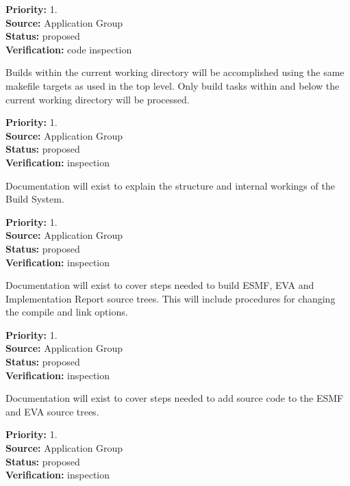 \begin{reqlist}
{\bf Priority:} 1. \\
{\bf Source:} Application Group \\
{\bf Status:} proposed \\
{\bf Verification:} code inspection
\end{reqlist}

Builds within the current working directory will be
accomplished using the same makefile targets as
used in the top level.
Only build tasks within and below the current working directory
will be processed.  
\begin{reqlist}
{\bf Priority:} 1. \\
{\bf Source:} Application Group \\
{\bf Status:} proposed \\
{\bf Verification:} inspection
\end{reqlist}

Documentation will exist to explain the structure and 
internal workings of the Build System.
\begin{reqlist}
{\bf Priority:} 1. \\
{\bf Source:} Application Group \\
{\bf Status:} proposed \\
{\bf Verification:} inspection
\end{reqlist}

Documentation will exist to cover steps needed to build ESMF,
EVA and Implementation Report  source trees.  This will include procedures for 
changing the compile and link options.
\begin{reqlist}
{\bf Priority:} 1. \\
{\bf Source:} Application Group \\
{\bf Status:} proposed \\
{\bf Verification:} inspection
\end{reqlist}

Documentation will exist to cover steps needed to add source
code to the ESMF and EVA source trees.
\begin{reqlist}
{\bf Priority:} 1. \\
{\bf Source:} Application Group \\
{\bf Status:} proposed \\
{\bf Verification:} inspection
\end{reqlist}

